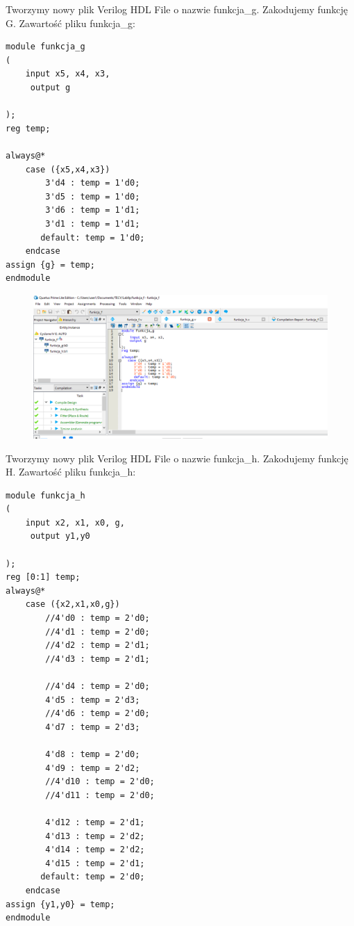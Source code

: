 \documentclass[]{article}
\begin{document}
Tworzymy nowy plik Verilog HDL File o nazwie funkcja\_g. Zakodujemy funkcję G. 
\newline
Zawartość pliku funkcja\_g:
\begin{lstlisting}[style={prettyverilog}]
module funkcja_g
(
    input x5, x4, x3,
	 output g

);
reg temp;

always@* 
	case ({x5,x4,x3}) 
		3'd4 : temp = 1'd0;
		3'd5 : temp = 1'd0;
		3'd6 : temp = 1'd1;
		3'd1 : temp = 1'd1;
	   default: temp = 1'd0;
    endcase
assign {g} = temp;	 
endmodule

\end{lstlisting}
\begin{figure}[H]
	\centering
	\includegraphics[width=1.39\textwidth]{1.16.png}
\end{figure}
Tworzymy nowy plik Verilog HDL File o nazwie funkcja\_h. Zakodujemy funkcję H. 
\newline
Zawartość pliku funkcja\_h:
\begin{lstlisting}[style={prettyverilog}]
module funkcja_h
(
    input x2, x1, x0, g,
	 output y1,y0

);
reg [0:1] temp;
always@* 
	case ({x2,x1,x0,g}) 
		//4'd0 : temp = 2'd0;
		//4'd1 : temp = 2'd0;
		//4'd2 : temp = 2'd1;
		//4'd3 : temp = 2'd1;
		
		//4'd4 : temp = 2'd0;
		4'd5 : temp = 2'd3;
		//4'd6 : temp = 2'd0;
		4'd7 : temp = 2'd3;
		
		4'd8 : temp = 2'd0;
		4'd9 : temp = 2'd2;
		//4'd10 : temp = 2'd0;
		//4'd11 : temp = 2'd0;
		
		4'd12 : temp = 2'd1;
		4'd13 : temp = 2'd2;
		4'd14 : temp = 2'd2;
		4'd15 : temp = 2'd1;
	   default: temp = 2'd0;
    endcase
assign {y1,y0} = temp;	 
endmodule
\end{lstlisting}
\end{document}
